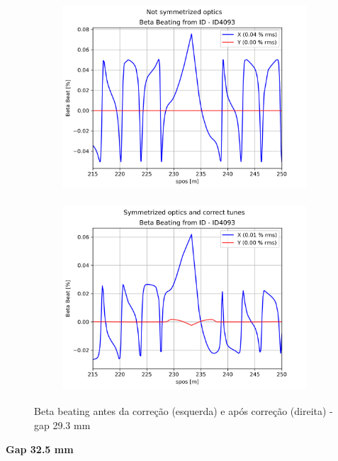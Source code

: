 \documentclass[a4paper,12pt]{article}
\begin{document}
\begin{figure}[H]
\begin{subfigure}{0.5\textwidth}
\includegraphics[width=0.9\linewidth, height=7cm]{figs/phase-25 gap29 uncorrected-optics.png} 
\label{fig:subim1-2529}
\end{subfigure}
\begin{subfigure}{0.5\textwidth}
\includegraphics[width=0.9\linewidth, height=7cm]{figs/phase-25 gap29 corrected-optics-tunes.png}
\label{fig:subim2-2529}
\end{subfigure}
\caption{Beta beating antes da correção (esquerda) e após correção (direita) - gap 29.3 mm}
\label{fig:bb-25_29}
\end{figure}

\textbf{Gap 32.5 mm} \\
\end{document}
